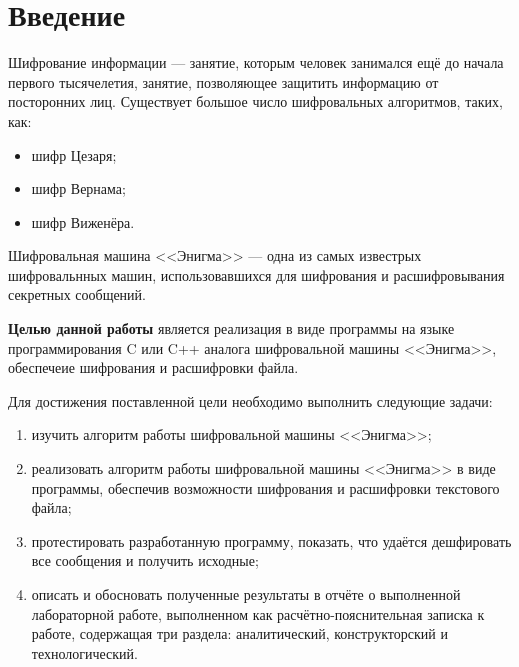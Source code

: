 \chapter*{Введение}

Шифрование информации --- занятие, которым человек занимался ещё до начала первого тысячелетия, занятие, позволяющее защитить информацию от посторонних лиц. 
Существует большое число шифровальных алгоритмов, таких, как:
\begin{itemize}[label=---]
    \item шифр Цезаря;
    \item шифр Вернама;
    \item шифр Виженёра.
\end{itemize}


Шифровальная машина <<Энигма>> --- одна из самых известрых шифровальнных машин, использовавшихся для шифрования и расшифровывания секретных сообщений.

\textbf{Целью данной работы} является реализация в виде программы на языке программирования C или C++ аналога шифровальной машины <<Энигма>>, обеспечеие шифрования и расшифровки файла. 

Для достижения поставленной цели необходимо выполнить следующие задачи:
\begin{enumerate}[label=\arabic*)]
	\item изучить алгоритм работы шифровальной машины <<Энигма>>;
    \item реализовать алгоритм работы шифровальной машины <<Энигма>> в виде программы, обеспечив возможности шифрования и расшифровки текстового файла;
	\item протестировать разработанную программу, показать, что удаётся дешфировать все сообщения и получить исходные;
	\item описать и обосновать полученные результаты в отчёте о выполненной лабораторной работе, выполненном как расчётно-пояснительная записка к работе, содержащая три раздела: аналитический, конструкторский и технологический.
\end{enumerate}